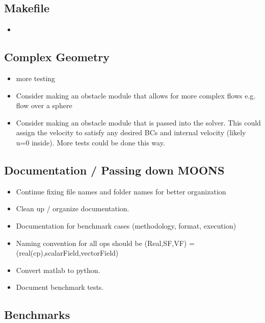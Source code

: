\documentclass[11pt]{article}
\begin{document}
\subsection{Makefile}
\begin{itemize}
\setlength\itemsep{-1em}
\item 
\end{itemize}

\subsection{Complex Geometry}
\begin{itemize}
\setlength\itemsep{-1em}
\item more testing
\item Consider making an obstacle module that allows for more complex flows
e.g. flow over a sphere
\item Consider making an obstacle module that is passed into the solver.
This could assign the velocity to satisfy any desired BCs and internal
velocity (likely u=0 inside). More tests could be done this way.
\end{itemize}

\subsection{Documentation / Passing down MOONS}
\begin{itemize}
\setlength\itemsep{-1em}
\item Continue fixing file names and folder names for better organization
\item Clean up / organize documentation.
\item Documentation for benchmark cases (methodology, format, execution)
\item Naming convention for all ops should be (Real,SF,VF) = (real(cp),scalarField,vectorField)
\item Convert matlab to python.
\item Document benchmark tests.
\end{itemize}

\subsection{Benchmarks}
\end{document}
